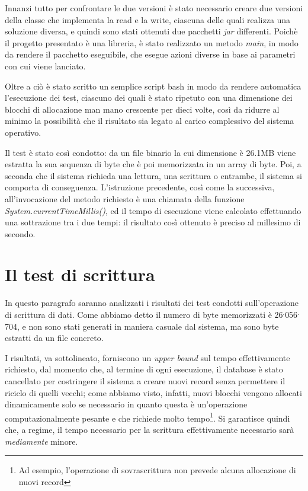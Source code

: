 Innanzi tutto per confrontare le due versioni è stato necessario creare due versioni della classe che implementa la read e la write, ciascuna delle quali realizza una soluzione diversa, e quindi sono stati ottenuti due pacchetti \emph{jar} differenti. Poichè il progetto presentato è una libreria, è stato realizzato un metodo \emph{main}, in modo da rendere il pacchetto eseguibile, che esegue azioni diverse in base ai parametri con cui viene lanciato.

Oltre a ciò è stato scritto un semplice script bash in modo da rendere automatica l'esecuzione dei test, ciascuno dei quali è stato ripetuto con una dimensione dei blocchi di allocazione man mano crescente per dieci volte, così da ridurre al minimo la possibilità che il risultato sia legato al carico complessivo del sistema operativo.

Il test è stato così condotto: da un file binario la cui dimensione è 26.1MB viene estratta la sua sequenza di byte che è poi memorizzata in un array di byte. Poi, a seconda che il sistema richieda una lettura, una scrittura o entrambe, il sistema si comporta di conseguenza. L'istruzione precedente, così come la successiva, all'invocazione del metodo richiesto è una chiamata della funzione \emph{System.currentTimeMillis()}, ed il tempo di esecuzione viene calcolato effettuando una sottrazione tra i due tempi: il risultato così ottenuto è preciso al millesimo di secondo.

\section{Il test di scrittura}
In questo paragrafo saranno analizzati i risultati dei test condotti sull'operazione di scrittura di dati. Come abbiamo detto il numero di byte memorizzati è 26$^{.}$056$^{.}$704, e non sono stati generati in maniera casuale dal sistema, ma sono byte estratti da un file concreto.

I risultati, va sottolineato, forniscono un \emph{upper bound} sul tempo effettivamente richiesto, dal momento che, al termine di ogni esecuzione, il database è stato cancellato per costringere il sistema a creare nuovi record senza permettere il riciclo di quelli vecchi; come abbiamo visto, infatti, nuovi blocchi vengono allocati dinamicamente solo se necessario in quanto questa è un'operazione computazionalmente pesante e che richiede molto tempo\footnote{Ad esempio, l'operazione di sovrascrittura non prevede alcuna allocazione di nuovi record}. Si garantisce quindi che, a regime, il tempo necessario per la scrittura effettivamente necessario sarà \emph{mediamente} minore.

